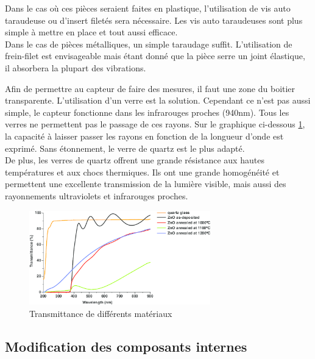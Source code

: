 Dans le cas où ces pièces seraient faites en plastique, l’utilisation de vis auto taraudeuse ou d’insert 
filetés sera nécessaire. Les vis auto taraudeuses sont plus simple à mettre en place et tout aussi 
efficace. \\
Dans le cas de pièces métalliques, un simple taraudage suffit. L’utilisation de frein-filet est envisageable 
mais étant donné que la pièce serre un joint élastique, il absorbera la plupart des vibrations.\par 
Afin de permettre au capteur de faire des mesures, il faut une zone du boitier transparente. L’utilisation 
d'un verre est la solution. Cependant ce n’est pas aussi simple, le capteur fonctionne dans les infrarouges proches 
(940nm). Tous les verres ne permettent pas le passage de ces rayons. Sur le graphique ci-dessous \ref{fig:wavelength},
la capacité à laisser passer les rayons en fonction de la longueur d’onde est exprimé. Sans étonnement,
le verre de quartz est le plus adapté.\\
De plus, les verres de quartz offrent une grande résistance aux hautes températures et aux chocs 
thermiques. Ils ont une grande homogénéité et permettent une excellente transmission de la lumière visible, mais 
aussi des rayonnements ultraviolets et infrarouges proches\footnotemark[1].


\begin{figure}[H]
    \centering
    \includegraphics[width=0.7\textwidth]{Images/photos_PGA/wavelength.png}
    \caption{Transmittance de différents matériaux}
    \label{fig:wavelength}
\end{figure}

\subsection{Modification des composants internes}

